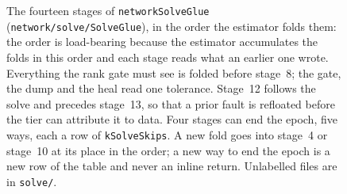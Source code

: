 \documentclass[main.tex]{subfiles}
\begin{document}
\begin{figure}[tbp]
{}
\caption{The fourteen stages of \texttt{networkSolveGlue}
(\texttt{network/solve/SolveGlue}), in the order the estimator folds them: the
order is load-bearing because the estimator accumulates the folds in this
order and each stage reads what an earlier one wrote. Everything the rank
gate must see is folded before stage~8; the gate, the dump and the heal read
one tolerance. Stage~12 follows the solve and precedes stage~13, so that a
prior fault is refloated before the tier can attribute it to data. Four
stages can end the epoch, five ways, each a row of \texttt{kSolveSkips}. A new
fold goes into stage~4 or stage~10 at its place in the order; a new way to end
the epoch is a new row of the table and never an inline return. Unlabelled
files are in \texttt{solve/}.}
\label{fig:net-solve}
\end{figure}
\end{document}
